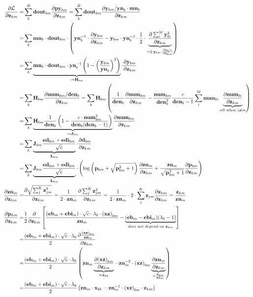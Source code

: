 \documentclass{article}
\begin{document}
\begin{align*}
    \ddfrac{\mathcal{L}}{\v{z}{km}} = & \sum_b^B \v{dout}{bm} \ddfrac{\v{py}{bm}}{\v{z}{km}} = \sum_b^B \v{dout}{bm} \ddfrac{\v{y}{bm} / \v{yn}{b} \cdot \v{mn}{b}}{\v{z}{km}} \\
    =& \sum_b \v{mn}{b} \cdot \v{dout}{bm} \cdot \left(\v{yn}{b}^{-1} \cdot \ddfrac{\v{y}{bm}}{\v{z}{km}} - \v{y}{bm} \cdot \v{yn}{b}^{-3} \cdot \frac{1}{2} \cdot \underbrace{\ddfrac{\sum_i^M \v{y}_{bi}^2}{\v{z}{km}}}_{=2 \cdot \v{y}{bm} \cdot \ddfrac{\v{y}_bm}{\v{z}{km}}} \right) \\
    =& \sum_b \underbrace{\v{mn}{b} \cdot \v{dout}{bm} \cdot \v{yn}{b}^{-1} \left( 1 - \left( \frac{\v{y}{bm}}{\v{yn}{b}} \right)^2 \right)}_{:= \v{H}{bm}} \cdot \ddfrac{\v{y}{bm}}{\v{z}{km}} \\
    =& \sum_b \v{H}{bm} \ddfrac{\v{num}{bm} / \v{den}{b}}{\v{z}{km}} = \sum_b \v{H}{bm} \left( \frac{1}{\v{den}{b}} \ddfrac{\v{num}{bm}}{\v{z}{km}} - \frac{\v{num}{bm}}{\v{den}{b}^2} \frac{c}{\v{den}{b} - 1} \sum_i^M \v{num}{bi} \underbrace{\ddfrac{\v{num}{bi}}{\v{z}{km}}}_{=0 \text{ when } i\neq m}  \right) \\
    =& \sum_b \underbrace{\v{H}{bm} \frac{1}{\v{den}{b}} \left( 1 - \frac{c \cdot \v{num}{bm}^2}{\v{den}{b} (\v{den}{b} - 1)} \right)}_{:= \v{J}{bm}} \ddfrac{\v{num}{bm}}{\v{z}{km}} \\
    =& \sum_b \underbrace{\v{J}{bm} \frac{\v{ed}{bm} + \v{edi}{bm}}{\sqrt{c}}}_{\v{L}{bm}} \cdot \ddfrac{\v{d}{bm}}{\v{z}{km}} \\
    =& \sum_b \underbrace{\v{J}{bm} \frac{\v{ed}{bm} + \v{edi}{bm}}{\sqrt{c}}}_{\v{L}{bm}} \cdot \left( \log \left( \v{p}{bm} + \sqrt{\v{p}{bm}^2 + 1} \right) \ddfrac{\v{zn}{m}}{\v{z}{km}} + \frac{\v{zn}{m}}{\sqrt{\v{p}{bm}^2 + 1}} \ddfrac{\v{p}{bm}}{\v{z}{km}} \right) \\
    \ddfrac{\v{zn}{m}}{\v{z}{km}} =& \ddfrac{\sqrt{\sum_j^K \v{z}{jm}^2}}{\v{z}{km}} = \frac{1}{2 \cdot \v{zn}{m}} \ddfrac{\sum_j^K \v{z}{jm}^2}{\v{z}{km}} = \frac{1}{2 \cdot \v{zn}{m}} \cdot 2 \cdot \sum_j^K \v{z}{jm} \ddfrac{\v{z}{km}}{\v{z}{km}} = \frac{\v{z}{km}}{\v{zn}{m}} \\
    \ddfrac{\v{p}{km}}{\v{z}{km}} =& \frac{1}{2} \ddfrac{}{\v{z}{km}} \left[ \frac{(\v{eb}{m} + \v{ebi}{m}) \cdot \sqrt{c} \cdot \lambda_b \cdot \v{(xz)}{bm}}{\v{zn}{m}} - \underbrace{(\v{eb}{m} - \v{ebi}{m})(\lambda_b - 1)}_{\text{does not depend on } \v{z}{km}} \right] \\
    =& \frac{(\v{eb}{m} + \v{ebi}{m}) \cdot \sqrt{c} \cdot \lambda_b}{2} \ddfrac{\frac{\v{(xz)}{bm}}{\v{zn}{m}}}{\v{z}{km}}\\
    =& \frac{(\v{eb}{m} + \v{ebi}{m}) \cdot \sqrt{c} \cdot \lambda_b}{2} \left( \v{zn}{m} \underbrace{\ddfrac{\v{(xz)}{bm}}{\v{z}{km}}}_{=\v{x}{bk}} - \v{zn}{m}^{-2} \cdot \v{(xz)}{bm} \underbrace{\ddfrac{\v{zn}{m}}{\v{z}{km}}}_{=\frac{\v{z}{km}}{\v{zn}{m}}} \right) \\
    =& \frac{(\v{eb}{m} + \v{ebi}{m}) \cdot \sqrt{c} \cdot \lambda_b}{2} \left( \v{zn}{m} \cdot \v{x}{bk} - \v{zn}{m}^{-1} \cdot \v{(xz)}{bm} \cdot \v{z}{km} \right) \\
\end{align*}
\end{document}
